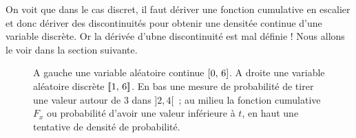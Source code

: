 On voit que dans le cas discret, il faut dériver une fonction
cumulative \og{} en escalier \fg{} et donc dériver des discontinuités
pour obtenir une densitée continue d'une variable discrète. Or la dérivée d'ubne discontinuité est mal définie ! Nous allons le voir dans la section suivante.

\clearpage

\begin{figure}[ht!]\centering
    \caption{A gauche une variable aléatoire continue ${\left[0,\,6\right]}$. A droite une variable aléatoire discrète ${[\![ 1,\,6]\!]}$. En bas une mesure de probabilité de tirer une valeur autour de 3 dans $]2, 4[$~; au milieu la fonction cumulative $F_x$ ou probabilité d'avoir une valeur inférieure à $t$, en haut une tentative de densité de probabilité.}
    \label{fig:densites}
  \end{figure}
  
